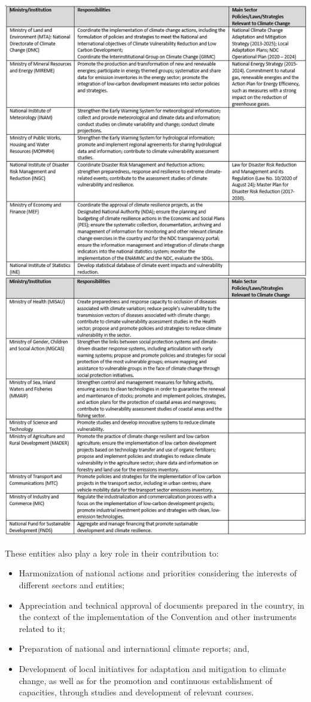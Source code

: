 \documentclass[
]{book}
\providecommand{\tightlist}{%
  \setlength{\itemsep}{0pt}\setlength{\parskip}{0pt}}
\begin{document}
\includegraphics{Figure27.png}

These entities also play a key role in their contribution to:

\begin{itemize}
\tightlist
\item
  Harmonization of national actions and priorities considering the interests of different sectors and entities;
\item
  Appreciation and technical approval of documents prepared in the country, in the context of the implementation of the Convention and other instruments related to it;
\item
  Preparation of national and international climate reports; and,
\item
  Development of local initiatives for adaptation and mitigation to climate change, as well as for the promotion and continuous establishment of capacities, through studies and development of relevant courses.
\end{itemize}
\end{document}
